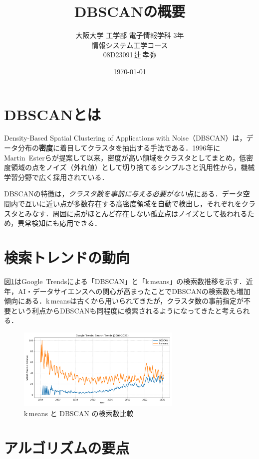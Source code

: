 \documentclass[a4j]{jsarticle}
\title{DBSCANの概要}
\author{大阪大学 工学部 電子情報学科 3年\\情報システム工学コース\\08D23091\,辻\,孝弥}
\date{\today}
\begin{document}
\maketitle

\section{DBSCANとは}

Density-Based Spatial Clustering of Applications with Noise（DBSCAN）は，データ分布の\textbf{密度}に着目してクラスタを抽出する手法である．1996年にMartin~Esterらが提案して以来，密度が高い領域をクラスタとしてまとめ，低密度領域の点をノイズ（外れ値）として切り捨てるシンプルさと汎用性から，機械学習分野で広く採用されている．

DBSCANの特徴は，\emph{クラスタ数を事前に与える必要がない}点にある．データ空間内で互いに近い点が多数存在する高密度領域を自動で検出し，それぞれをクラスタとみなす．周囲に点がほとんど存在しない孤立点はノイズとして扱われるため，異常検知にも応用できる．

\section{検索トレンドの動向}
図\ref{fig:trends}はGoogle~Trendsによる「DBSCAN」と「k\,\-means」の検索数推移を示す．近年，AI・データサイエンスへの関心が高まったことでDBSCANの検索数も増加傾向にある．k\,\-meansは古くから用いられてきたが，クラスタ数の事前指定が不要という利点からDBSCANも同程度に検索されるようになってきたと考えられる．

\begin{figure}[htbp]
  \centering
  \includegraphics[width=0.7\textwidth]{trends_comparison.pdf}
  \caption{k\,\-means と DBSCAN の検索数比較}
  \label{fig:trends}
\end{figure}

\section{アルゴリズムの要点}
\end{document}
